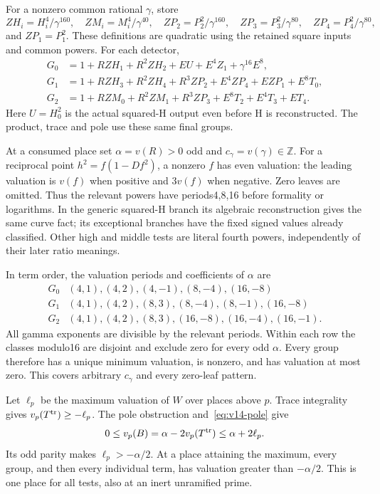 For a nonzero common rational $\gamma$, store
\[
 ZH_i=H_i^4/\gamma^{160},\quad ZM_i=M_i^4/\gamma^{40},\quad
 ZP_2=P_2^2/\gamma^{160},\quad
 ZP_3=P_3^2/\gamma^{80},\quad ZP_4=P_4^2/\gamma^{80},
\]
and $ZP_1=P_1^2$. These definitions are quadratic using the
retained square inputs and common powers. For each detector,
\begin{align}
 G_0&=1+RZH_1+R^2ZH_2+EU+E^4Z_1+\gamma^{16}E^8,\label{eq:v14-g0}\\
 G_1&=1+RZH_3+R^2ZH_4+R^3ZP_2+E^4ZP_4+EZP_1+E^8T_0,\label{eq:v14-g1}\\
 G_2&=1+RZM_0+R^2ZM_1+R^3ZP_3+E^8T_2+E^4T_3+ET_4.\label{eq:v14-g2}
\end{align}
Here $U=H_0^2$ is the actual squared-H output even before
H is reconstructed. The product, trace and pole use these
same final groups.

At a consumed place set $\alpha=v(R)>0$ odd and
$c_\gamma=v(\gamma)\in\mathbb Z$. For a reciprocal point
$h^2=f(1-Df^2)$, a nonzero $f$ has even valuation: the leading
valuation is $v(f)$ when positive and $3v(f)$ when negative.
Zero leaves are omitted. Thus the relevant powers have
periods4,8,16 before formality or logarithms. In the generic
squared-H branch its algebraic reconstruction gives the same
curve fact; its exceptional branches have the fixed signed
values already classified. Other high and middle tests are
literal fourth powers, independently of their later ratio meanings.

In term order, the valuation periods and coefficients of
$\alpha$ are
\[
 \begin{array}{c|l}
 G_0&(4,1),(4,2),(4,-1),(8,-4),(16,-8)\\
 G_1&(4,1),(4,2),(8,3),(8,-4),(8,-1),(16,-8)\\
 G_2&(4,1),(4,2),(8,3),(16,-8),(16,-4),(16,-1).
 \end{array}
\]
All gamma exponents are divisible by the relevant periods.
Within each row the classes modulo16 are disjoint and exclude
zero for every odd $\alpha$. Every group therefore has a unique
minimum valuation, is nonzero, and has valuation at most zero.
This covers arbitrary $c_\gamma$ and every zero-leaf pattern.

Let $\ell_p$ be the maximum valuation of $W$ over places above
$p$. Trace integrality gives $v_p(T^{\rm tr})\geq-\ell_p$.
The pole obstruction and~\eqref{eq:v14-pole} give
\[
 0\leq v_p(B)=\alpha-2v_p(T^{\rm tr})\leq\alpha+2\ell_p.
\]
Its odd parity makes $\ell_p>-\alpha/2$. At a place attaining
the maximum, every group, and then every individual term,
has valuation greater than $-\alpha/2$. This is one place for
all tests, also at an inert unramified prime.

